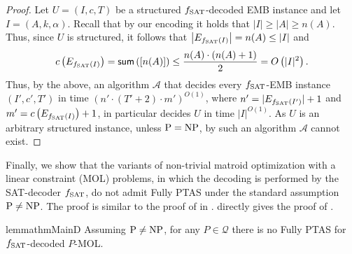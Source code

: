 \documentclass[11pt,letter]{article}
\newcommand{\cA}{{\mathcal{A}}}
\newcommand{\cQ}{{\mathcal{Q}}}
\newcommand{\fs}{f_{\textnormal{SAT}}}
\newcommand{\io}{|I|^{O(1)}}
\begin{document}
\begin{proof}
	Let $U = (I,c,T)$ be a structured $\fs$-decoded EMB instance and let $I = (A,k,\alpha)$. Recall that by our encoding it holds that $|I| \geq |A| \geq n(A)$. Thus, %
	since $U$ is structured, it follows that  $\left|E_{\fs(I)}\right| = n(A) \leq |I|$ and 
	$$c\left(E_{\fs(I)}\right) = \textsf{sum}\left(\left[n(A)\right]\right) \leq \frac{n(A) \cdot (n(A)+1)}{2} = O\left(|I|^2\right).$$
	Thus, by the above, an algorithm $\cA$ that decides every $\fs$-EMB  instance $(I',c',T')$ in time $(n' \cdot(T'+2) \cdot m')^{O(1)}$, where  $n' = |E_{\fs(I')}|+1$ and $m' = c\left(E_{\fs(I)}\right) +1$, in particular decides $U$ in time $\io$. As $U$ is an arbitrary structured instance, unless $\textnormal{P} = \textnormal{NP}$, by  such an algorithm $\cA$ cannot exist.  
\end{proof}


	Finally, %
	we show that %
the variants of non-trivial matroid optimization with a linear constraint (MOL) problems, in which the decoding is performed by the SAT-decoder $\fs$, do not admit Fully PTAS under the standard assumption $\textnormal{P} \neq \textnormal{NP}$.   The proof is similar to the proof of  in .  directly gives the proof of .

\begin{restatable}{lemma}{thmMainD}
	\label{thm:mainD}
	Assuming $\textnormal{P} \neq \textnormal{NP}$, for any $P \in \cQ$ there is no \textnormal{Fully PTAS} for $\fs$-\textnormal{decoded} $P$-\textnormal{MOL}. 
\end{restatable}
\end{document}
